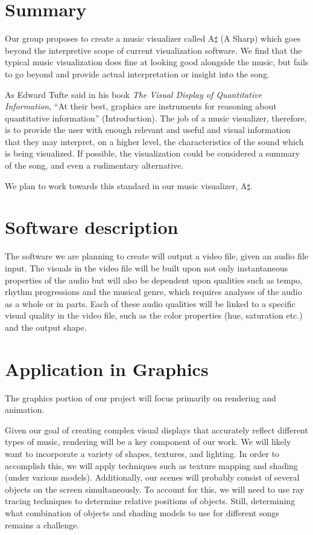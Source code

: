 \documentclass{article}
\begin{document}
\section{Summary}

Our group proposes to create a music visualizer called A$\sharp$ (A Sharp) which goes beyond the interpretive scope of current visualization software.  We find that the typical music visualization does fine at looking good alongside the music, but fails to go beyond and provide actual interpretation or insight into the song.

As Edward Tufte said in his book \textit{The Visual Display of Quantitative Information}, ``At their best, graphics are instruments for reasoning about quantitative information'' (Introduction).  The job of a music visualizer, therefore, is to provide the user with enough relevant and useful and visual information that they may interpret, on a higher level, the characteristics of the sound which is being visualized.  If possible, the visualization could be considered a summary of the song, and even a rudimentary alternative.

We plan to work towards this standard in our music visualizer, A$\sharp$.

\section{Software description}

The software we are planning to create will output a video file, given an audio file input. The visuals in the video file will be built upon not only instantaneous properties of the audio but will also be dependent upon qualities such as tempo, rhythm progressions and the musical genre, which requires analyses of the audio as a whole or in parts. Each of these audio qualities will be linked to a specific visual quality in the video file, such as the color properties (hue, saturation etc.) and the output shape.

\section{Application in Graphics}

The graphics portion of our project will focus primarily on rendering and animation.
 
Given our goal of creating complex visual displays that accurately reflect different types of music, rendering will be a key component of our work. We will likely want to incorporate a variety of shapes, textures, and lighting. In order to accomplish this, we will apply techniques such as texture mapping and shading (under various models). Additionally, our scenes will probably consist of several objects on the screen simultaneously. To account for this, we will need to use ray tracing techniques to determine relative positions of objects. Still, determining what combination of objects and shading models to use for different songs remains a challenge.
 
\end{document}
